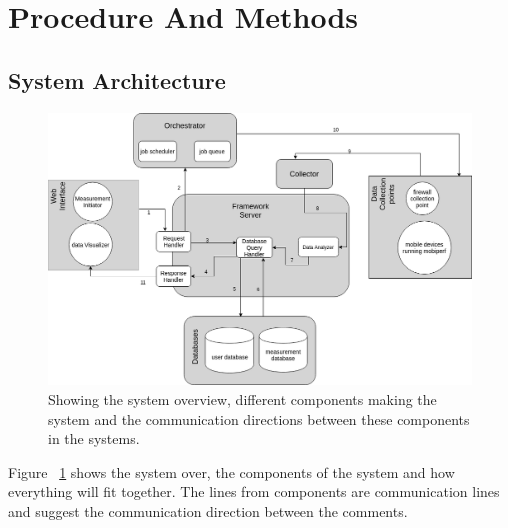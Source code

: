 \section{Procedure And Methods}
\subsection{System Architecture}
\begin{figure}
	\begin{center}
		\includegraphics[width=1\linewidth]{res/system.png}
	\end{center}
	\caption{Showing the system overview, different components making the system and the communication directions between these components in the systems.}
	\label{figure:system}
\end{figure}
Figure ~\ref{figure:system} shows the system over, the components of the system and how everything will fit together. The lines from components are communication lines and suggest the communication direction between the comments. 
